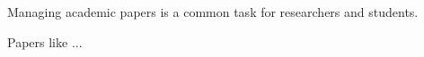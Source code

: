 Managing academic papers is a common task for researchers and students.

Papers like \cite{zhao2023ompl}...

